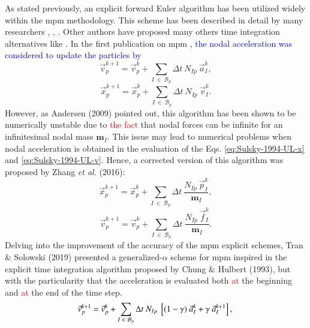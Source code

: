\documentclass[preprint,12pt,a4paper]{elsarticle}
\newcommand{\tens}[1]{
  \ensuremath{\mathbf{{#1}}}
}
\begin{document}
As stated previously, an explicit forward Euler algorithm has been utilized widely within the \acrshort{mpm} methodology. This scheme has been described in detail by many researchers
\cite{Sulsky1994}, \cite{Bardenhagen2002}, \cite{thesis_Andersen_2009}. Other authors have proposed many others time integration alternatives like \cite{Guilkey_2003,Charlton_2017,Tran2019e}. In the
first publication on \acrshort{mpm} \cite{Sulsky1994}, \textcolor{blue}{the nodal acceleration
was considered to update the particles by}
\begin{equation}
  \label{eq:Sulsky-1994-UL-v}
  \vec{v}_p^{k+1} = \vec{v}_p^{k} + \sum_{I\ \in\ \mathcal{B}_p} \Delta t\ N_{Ip}\ \vec{a}_{I}^{k},
\end{equation}
\begin{equation}
  \label{eq:Sulsky-1994-UL-x}
  \vec{x}_p^{k+1} = \vec{x}_p^{k} + \sum_{I\ \in\ \mathcal{B}_p} \Delta t\ N_{Ip}\ \vec{v}_{I}^{k}.
\end{equation}
However, as Andersen (2009)\cite{thesis_Andersen_2009} pointed out, this algorithm has been shown to be numerically unstable due to \textcolor{red}{the fact} that nodal forces can be infinite for an infinitesimal nodal mass $\tens{m}_I$. This issue may lead to numerical problems when nodal acceleration is obtained in the evaluation of the Eqs. \eqref{eq:Sulsky-1994-UL-x} and \eqref{eq:Sulsky-1994-UL-v}. Hence, a
corrected version of this algorithm was proposed by Zhang {\it et al.}
(2016)\cite{Zhang_book_2016}:
\begin{equation}
  \label{eq:Zhang-2016-UL-x}
  \vec{x}_p^{k+1} = \vec{x}_p^{k} + \sum_{I\ \in\ \mathcal{B}_p} \Delta t\ \frac{N_{Ip}\ \vec{p}_{I}^{k}}{\tens{m}_I}, 
\end{equation}
\begin{equation}
  \label{eq:Zhang-2016-UL-v}
  \vec{v}_p^{k+1} = \vec{v}_p^{k} + \sum_{I\ \in\ \mathcal{B}_p} \Delta t\ \frac{N_{Ip}\ \vec{f}_{I}^{k}}{\tens{m}_I}.
\end{equation}
Delving into the improvement of the accuracy of the \acrshort{mpm} explicit schemes, Tran \& Solowski (2019)\cite{Tran2019e} presented a
generalized-$\alpha$ scheme for \acrshort{mpm} inspired in the explicit time
integration algorithm proposed by Chung \& Hulbert
(1993)\cite{Geranlized_alpha_1993}, but with the particularity that
the acceleration is evaluated both \textcolor{red}{at} the beginning and \textcolor{red}{at} the end of the time step.
\begin{equation}
  \label{eq:Tran-2019-GA-v}
  \vec{v}_p^{k+1} = \vec{v}_p^{k} + \sum_{I\ \in\ \mathcal{B}_p} \Delta t\  N_{Ip}\ \left[(1 - \gamma)\ \vec{a}_I^{k} +
    \gamma\ \vec{a}_I^{k+1} \right],\\
\end{equation}
\end{document}
